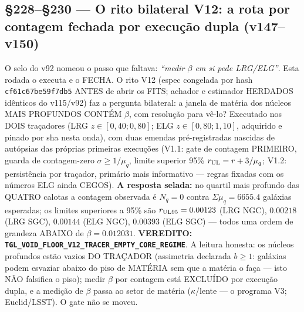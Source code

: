 \documentclass[11pt]{article}
\theoremstyle{definition}\newtheorem{deriv}{Derivação}
\begin{document}
\subsection*{\S228--\S230 --- O rito bilateral V12: a rota por contagem fechada por execução dupla (v147--v150)}O selo do v92 nomeou o passo que faltava: \emph{``medir $\beta$ em si pede LRG/ELG''}. Esta rodada o executa e o FECHA. O rito V12 (espec congelada por hash \texttt{cf61c67be59f7db5} ANTES de abrir os FITS; achador e estimador HERDADOS idênticos do v115/v92) faz a pergunta bilateral: a janela de matéria dos núcleos MAIS PROFUNDOS CONTÉM $\beta$, com resolução para vê-lo? Executado nos DOIS traçadores (LRG $z\in[0{,}40;0{,}80]$; ELG $z\in[0{,}80;1{,}10]$, adquirido e pinado por sha nesta onda), com duas emendas pré-registradas nascidas de autópsias das próprias primeiras execuções (V1.1: gate de contagem PRIMEIRO, guarda de contagem-zero $\sigma\ge1/\mu_q$, limite superior 95\% $r_{\rm UL}=r+3/\mu_q$; V1.2: persistência por traçador, primário mais informativo --- regras fixadas com os números ELG ainda CEGOS). \textbf{A resposta selada:} no quartil mais profundo das QUATRO calotas a contagem observada é $N_q=0$ contra $\Sigma\mu_q=6655.4$ galáxias esperadas; os limites superiores a 95\% são $r_{\rm UL95}=0.00123$ (LRG NGC), $0.00218$ (LRG SGC), $0.00144$ (ELG NGC), $0.00393$ (ELG SGC) --- todos uma ordem de grandeza ABAIXO de $\beta=0.012031$. \textbf{VEREDITO: \texttt{TGL\_VOID\_FLOOR\_V12\_TRACER\_EMPTY\_CORE\_REGIME}}. A leitura honesta: os núcleos profundos estão vazios DO TRAÇADOR (assimetria declarada $b\ge1$: galáxias podem esvaziar abaixo do piso de MATÉRIA sem que a matéria o faça --- isto NÃO falsifica o piso); medir $\beta$ por contagem está EXCLUÍDO por execução dupla, e a medição de $\beta$ passa ao setor de matéria ($\kappa$/lente --- o programa V3; Euclid/LSST). O gate não se moveu.
\end{document}
